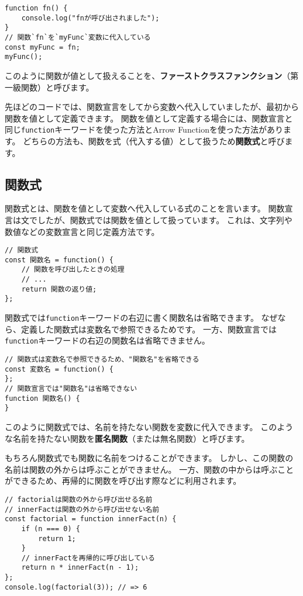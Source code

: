 \begin{lstlisting}
function fn() {
    console.log("fnが呼び出されました");
}
// 関数`fn`を`myFunc`変数に代入している
const myFunc = fn;
myFunc();
\end{lstlisting}

このように関数が値として扱えることを、\textbf{ファーストクラスファンクション}（第一級関数）と呼びます。

先ほどのコードでは、関数宣言をしてから変数へ代入していましたが、最初から関数を値として定義できます。
関数を値として定義する場合には、関数宣言と同じ\texttt{function}キーワードを使った方法とArrow
Functionを使った方法があります。
どちらの方法も、関数を式（代入する値）として扱うため\textbf{関数式}と呼びます。

\hypertarget{function-expression}{%
\subsection{関数式}\label{function-expression}}

関数式とは、関数を値として変数へ代入している式のことを言います。
関数宣言は文でしたが、関数式では関数を値として扱っています。
これは、文字列や数値などの変数宣言と同じ定義方法です。

\begin{lstlisting}
// 関数式
const 関数名 = function() {
    // 関数を呼び出したときの処理
    // ...
    return 関数の返り値;
};
\end{lstlisting}

関数式では\texttt{function}キーワードの右辺に書く関数名は省略できます。
なぜなら、定義した関数式は変数名で参照できるためです。
一方、関数宣言では\texttt{function}キーワードの右辺の関数名は省略できません。

\begin{lstlisting}
// 関数式は変数名で参照できるため、"関数名"を省略できる
const 変数名 = function() {
};
// 関数宣言では"関数名"は省略できない
function 関数名() {
}
\end{lstlisting}

このように関数式では、名前を持たない関数を変数に代入できます。
このような名前を持たない関数を\textbf{匿名関数}（または無名関数）と呼びます。

もちろん関数式でも関数に名前をつけることができます。
しかし、この関数の名前は関数の外からは呼ぶことができません。
一方、関数の中からは呼ぶことができるため、再帰的に関数を呼び出す際などに利用されます。

\begin{lstlisting}
// factorialは関数の外から呼び出せる名前
// innerFactは関数の外から呼び出せない名前
const factorial = function innerFact(n) {
    if (n === 0) {
        return 1;
    }
    // innerFactを再帰的に呼び出している
    return n * innerFact(n - 1);
};
console.log(factorial(3)); // => 6
\end{lstlisting}


